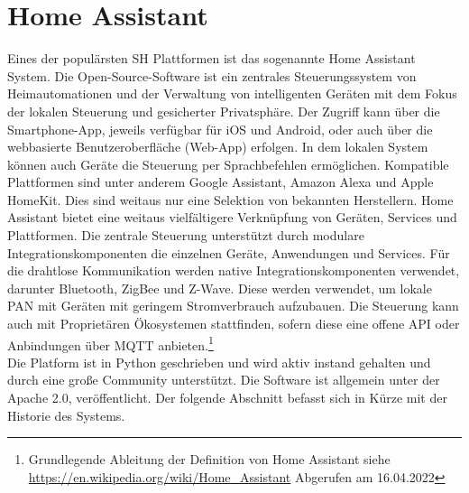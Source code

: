 \section{Home Assistant}
\label{sec:homeassistant}
    Eines der populärsten \acl{SH} Plattformen ist das sogenannte Home Assistant System. Die Open-Source-Software ist ein zentrales 
    Steuerungssystem von Heimautomationen und der Verwaltung von intelligenten Geräten mit dem Fokus der lokalen Steuerung und gesicherter 
    Privatsphäre. Der Zugriff kann über die Smartphone-App, jeweils verfügbar für iOS und Android, oder auch über die webbasierte 
    Benutzeroberfläche (Web-App) erfolgen. In dem lokalen System können auch Geräte die Steuerung per Sprachbefehlen ermöglichen. Kompatible 
    Plattformen sind unter anderem Google Assistant, Amazon Alexa und Apple HomeKit. Dies sind weitaus nur eine Selektion von bekannten 
    Herstellern. Home Assistant bietet eine weitaus vielfältigere Verknüpfung von Geräten, Services und Plattformen. Die zentrale Steuerung 
    unterstützt durch modulare Integrationskomponenten die einzelnen Geräte, Anwendungen und Services. Für die drahtlose Kommunikation 
    werden native Integrationskomponenten verwendet, darunter Bluetooth, ZigBee und Z-Wave. Diese werden verwendet, um lokale \ac{PAN} mit 
    Geräten mit geringem Stromverbrauch aufzubauen. Die Steuerung kann auch mit Proprietären Ökosystemen stattfinden, sofern diese eine offene 
    \acs{API} oder Anbindungen über \acs{MQTT} anbieten.\footnote{Grundlegende Ableitung der Definition von Home Assistant siehe \url{https://en.wikipedia.org/wiki/Home_Assistant} Abgerufen am 16.04.2022}
    \\
    Die Platform ist in Python geschrieben und wird aktiv instand gehalten und durch eine große Community unterstützt. Die Software ist allgemein unter 
    der Apache 2.0, veröffentlicht. Der folgende Abschnitt befasst sich in Kürze mit der Historie des Systems. 
    
